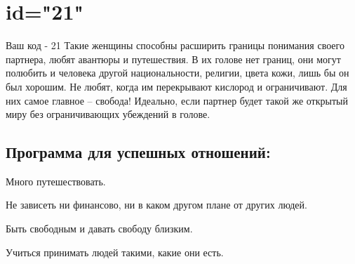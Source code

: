 \section{id="21"}{Ваш код - 21}
Такие женщины способны расширить границы понимания своего партнера, 
любят авантюры и путешествия. В их голове нет границ, они могут 
полюбить и человека другой национальности, религии, цвета кожи, лишь 
бы он был хорошим. Не любят, когда им перекрывают кислород и 
ограничивают. Для них самое главное – свобода! Идеально, если партнер 
будет такой же открытый миру без ограничивающих убеждений в голове.
\subsection{Программа для успешных отношений:}
\item Много путешествовать.
\item Не зависеть ни финансово, ни в каком другом плане от других 
людей.
\item Быть свободным и давать свободу близким.
\item Учиться принимать людей такими, какие они есть.
\endsubsection
\endsection

